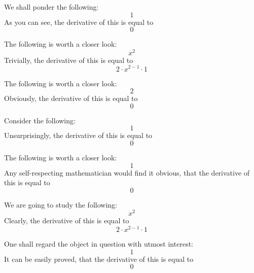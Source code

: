 \documentclass{article}
\begin{document}
We shall ponder the following:
\begin{equation}
1 
\end{equation}
As you can see, the derivative of this is equal to
\begin{equation}
0 
\end{equation}

The following is worth a closer look:
\begin{equation}
x ^{2 } 
\end{equation}
Trivially, the derivative of this is equal to
\begin{equation}
2 \cdot x ^{2 - 1 } \cdot 1 
\end{equation}

The following is worth a closer look:
\begin{equation}
2 
\end{equation}
Obviously, the derivative of this is equal to
\begin{equation}
0 
\end{equation}

Consider the following:
\begin{equation}
1 
\end{equation}
Unsurprisingly, the derivative of this is equal to
\begin{equation}
0 
\end{equation}

The following is worth a closer look:
\begin{equation}
1 
\end{equation}
Any self-respecting mathematician would find it obvious, that the derivative of this is equal to
\begin{equation}
0 
\end{equation}

We are going to study the following:
\begin{equation}
x ^{2 } 
\end{equation}
Clearly, the derivative of this is equal to
\begin{equation}
2 \cdot x ^{2 - 1 } \cdot 1 
\end{equation}

One shall regard the object in question with utmost interest:
\begin{equation}
1 
\end{equation}
It can be easily proved, that the derivative of this is equal to
\begin{equation}
0 
\end{equation}
\end{document}
